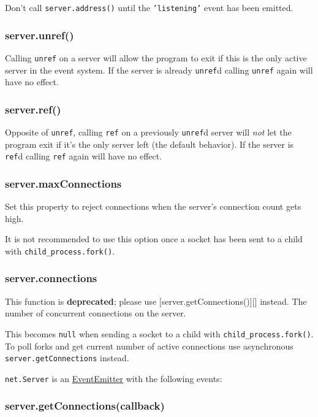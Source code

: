Don't call \texttt{server.address()} until the \texttt{'listening'}
event has been emitted.

\subsubsection{server.unref()}

Calling \texttt{unref} on a server will allow the program to exit if
this is the only active server in the event system. If the server is
already \texttt{unref}d calling \texttt{unref} again will have no
effect.

\subsubsection{server.ref()}

Opposite of \texttt{unref}, calling \texttt{ref} on a previously
\texttt{unref}d server will \emph{not} let the program exit if it's the
only server left (the default behavior). If the server is \texttt{ref}d
calling \texttt{ref} again will have no effect.

\subsubsection{server.maxConnections}

Set this property to reject connections when the server's connection
count gets high.

It is not recommended to use this option once a socket has been sent to
a child with \texttt{child\_process.fork()}.

\subsubsection{server.connections}

This function is \textbf{deprecated}; please use
{[}server.getConnections(){]}{[}{]} instead. The number of concurrent
connections on the server.

This becomes \texttt{null} when sending a socket to a child with
\texttt{child\_process.fork()}. To poll forks and get current number of
active connections use asynchronous \texttt{server.getConnections}
instead.

\texttt{net.Server} is an
\href{events.html\#events\_class\_events\_eventemitter}{EventEmitter}
with the following events:

\subsubsection{server.getConnections(callback)}

